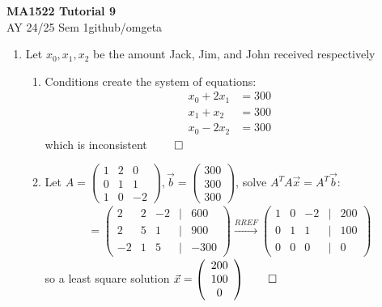 \documentclass[12pt, a4paper]{article}
\newcommand{\mytitle}{MA1522 Tutorial 9}
\newcommand{\myauthor}{github/omgeta}
\newcommand{\mydate}{AY 24/25 Sem 1}
\begin{document}
\raggedright
\footnotesize
\begin{center}
{\normalsize{\textbf{\mytitle}}} \\
{\footnotesize{\mydate\hspace{2pt}\textemdash\hspace{2pt}\myauthor}}
\end{center}

\begin{enumerate}[Q\arabic*.]
  \item Let $x_0, x_1, x_2$ be the amount Jack, Jim, and John received respectively
    \begin{enumerate}[(\alph*)]
      \item Conditions create the system of equations:
        \begin{align*}
          x_0 + 2x_1 &= 300\\
          x_1 + x_2 &= 300\\
          x_0 - 2x_2 &= 300
        \end{align*}
        which is inconsistent $\qed$

      \item Let $A = \left(\begin{array}{ccc} 1 & 2 & 0\\ 0 & 1 & 1\\ 1 & 0 & -2 \end{array}\right), \vec{b} = \left(\begin{array}{c} 300\\ 300\\ 300 \end{array}\right)$, solve $A^TA \vec{x} = A^T \vec{b}$:
        \begin{align*}
          [A^TA \mid A^T \vec{b}] = \left(\begin{array}{ccccc} 2 & 2 & -2 &|& 600\\ 2 & 5 & 1 &|& 900\\ -2 & 1 & 5 &|& -300 \end{array}\right) \xrightarrow{RREF} \left(\begin{array}{ccccc} 1 & 0 & -2 &|& 200\\ 0 & 1 & 1 &|& 100\\ 0 & 0 & 0 &|& 0 \end{array}\right)
        \end{align*}
        so a least square solution $\vec{x} = \left(\begin{array}{c} 200\\ 100\\0 \end{array}\right) \qed$
    \end{enumerate}


\end{enumerate}
\end{document}
